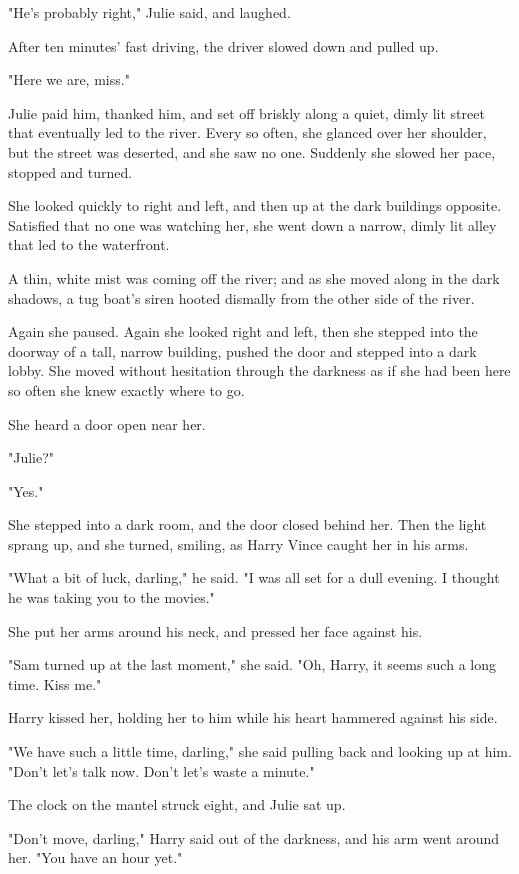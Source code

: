 \documentclass{novel}
\begin{document}
"He's probably right," Julie said, and laughed.

After ten minutes' fast driving, the driver slowed down and pulled up.

"Here we are, miss."

Julie paid him, thanked him, and set off briskly along a quiet, dimly lit street that eventually led to the river. Every so often, she glanced over her shoulder, but the street was deserted, and she saw no one. Suddenly she slowed her pace, stopped and turned.

She looked quickly to right and left, and then up at the dark buildings opposite. Satisfied that no one was watching her, she went down a narrow, dimly lit alley that led to the waterfront.

A thin, white mist was coming off the river; and as she moved along in the dark shadows, a tug boat's siren hooted dismally from the other side of the river.

Again she paused. Again she looked right and left, then she stepped into the doorway of a tall, narrow building, pushed the door and stepped into a dark lobby. She moved without hesitation through the darkness as if she had been here so often she knew exactly where to go.

She heard a door open near her.

"Julie?"

"Yes."

She stepped into a dark room, and the door closed behind her. Then the light sprang up, and she turned, smiling, as Harry Vince caught her in his arms.

"What a bit of luck, darling," he said. "I was all set for a dull evening. I thought he was taking you to the movies."

She put her arms around his neck, and pressed her face against his.

"Sam turned up at the last moment," she said. "Oh, Harry, it seems such a long time. Kiss me."

Harry kissed her, holding her to him while his heart hammered against his side.

"We have such a little time, darling," she said pulling back and looking up at him. "Don't let's talk now. Don't let's waste a minute."

The clock on the mantel struck eight, and Julie sat up.

"Don't move, darling," Harry said out of the darkness, and his arm went around her. "You have an hour yet."
\end{document}
